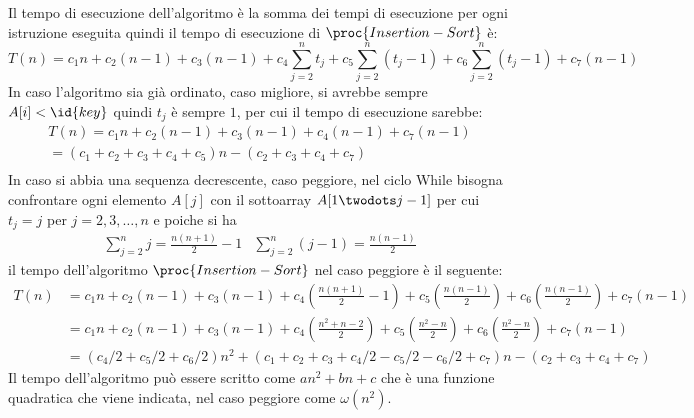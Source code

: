 Il tempo di esecuzione dell'algoritmo è la somma dei tempi di esecuzione per ogni
istruzione eseguita quindi il tempo di esecuzione di $\proc{Insertion-Sort}$ è:
\begin{equation*}
    T(n) = c_1n + c_2(n-1) + c_3(n-1) + c_4 \sum_{j=2} ^n t_j + c_5 \sum_{j=2} ^n (t_j -1)
         + c_6 \sum_{j=2} ^n (t_j -1) + c_7(n-1)
\end{equation*}
In caso l'algoritmo sia già ordinato, caso migliore, si avrebbe sempre $A[i] < \id{key}$
quindi $t_j$ è sempre $1$, per cui il tempo di esecuzione sarebbe:
\begin{align}
    T(n) = c_1n + c_2(n-1) + c_3(n-1) + c_4(n-1) + c_7(n-1) \\
         = (c_1 + c_2 + c_3 + c_4 + c_5)n - (c_2 + c_3+ c_4+ c_7) \\
\end{align}
In caso si abbia una sequenza decrescente, caso peggiore, nel ciclo While bisogna
confrontare ogni elemento $A[j]$ con il sottoarray $A[1 \twodots j-1]$ per cui $t_j = j$
per $j=2,3,\dots,n$ e poiche si ha
\begin{align}
    \sum _{j=2} ^ n j = \frac{n(n+1)}{2} -1 & \sum_{j=2}^n (j-1) = \frac{n(n-1)}{2}
\end{align}
il tempo dell'algoritmo $\proc{Insertion-Sort}$ nel caso peggiore è il seguente:
\begin{align}
    T(n) & = c_1n + c_2(n-1) + c_3(n-1) + c_4 (\frac{n(n+1)}{2} -1) + c_5 (\frac{n(n-1)}{2})
         + c_6 (\frac{n(n-1)}{2}) + c_7(n-1) \\
         & = c_1n + c_2(n-1) + c_3(n-1) + c_4(\frac{n^2+n-2}{2}) + c_5(\frac{n^2-n}{2})
           + c_6(\frac{n^2-n}{2}) + c_7(n-1) \\
         & = (c_4/2 +c_5/2 + c_6/2)n^2 + (c_1+c_2+c_3+c_4/2-c_5/2-c_6/2+c_7)n
           -(c_2+c_3+c_4+c_7)
\end{align}
Il tempo dell'algoritmo può essere scritto come $an^2 + bn + c$ che è una funzione
quadratica che viene indicata, nel caso peggiore come $\omega(n^2)$.
